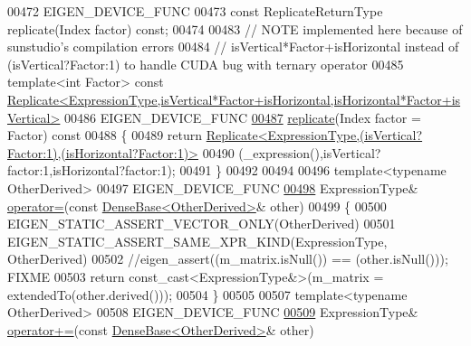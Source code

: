 \begin{DoxyCode}
00472     EIGEN\_DEVICE\_FUNC
00473     \textcolor{keyword}{const} ReplicateReturnType replicate(Index factor) \textcolor{keyword}{const};
00474 
00483     \textcolor{comment}{// NOTE implemented here because of sunstudio's compilation errors}
00484     \textcolor{comment}{// isVertical*Factor+isHorizontal instead of (isVertical?Factor:1) to handle CUDA bug with ternary
       operator}
00485     \textcolor{keyword}{template}<\textcolor{keywordtype}{int} Factor> \textcolor{keyword}{const} 
      \hyperlink{group___core___module_class_eigen_1_1_replicate}{Replicate<ExpressionType,isVertical*Factor+isHorizontal,isHorizontal*Factor+isVertical>}
00486     EIGEN\_DEVICE\_FUNC
\hyperlink{group___core___module_adafbfe5f623bc8fdc9877eb073f1ba5c}{00487}     \hyperlink{group___core___module_adafbfe5f623bc8fdc9877eb073f1ba5c}{replicate}(Index factor = Factor)\textcolor{keyword}{ const}
00488 \textcolor{keyword}{    }\{
00489       \textcolor{keywordflow}{return} 
      \hyperlink{group___core___module_class_eigen_1_1_replicate}{Replicate<ExpressionType,(isVertical?Factor:1),(isHorizontal?Factor:1)>}
00490           (\_expression(),isVertical?factor:1,isHorizontal?factor:1);
00491     \}
00492 
00494 
00496     \textcolor{keyword}{template}<\textcolor{keyword}{typename} OtherDerived>
00497     EIGEN\_DEVICE\_FUNC
\hyperlink{group___core___module_a61f54a2994758cc098671d5f0f36cfa6}{00498}     ExpressionType& \hyperlink{group___core___module_a61f54a2994758cc098671d5f0f36cfa6}{operator=}(\textcolor{keyword}{const} \hyperlink{group___core___module_class_eigen_1_1_dense_base}{DenseBase<OtherDerived>}& other)
00499     \{
00500       EIGEN\_STATIC\_ASSERT\_VECTOR\_ONLY(OtherDerived)
00501       EIGEN\_STATIC\_ASSERT\_SAME\_XPR\_KIND(ExpressionType, OtherDerived)
00502       \textcolor{comment}{//eigen\_assert((m\_matrix.isNull()) == (other.isNull())); FIXME}
00503       \textcolor{keywordflow}{return} \textcolor{keyword}{const\_cast<}ExpressionType&\textcolor{keyword}{>}(m\_matrix = extendedTo(other.derived()));
00504     \}
00505 
00507     \textcolor{keyword}{template}<\textcolor{keyword}{typename} OtherDerived>
00508     EIGEN\_DEVICE\_FUNC
\hyperlink{group___core___module_ad60d01ea6717f9ef6fd7941cf8b99db7}{00509}     ExpressionType& \hyperlink{group___core___module_ad60d01ea6717f9ef6fd7941cf8b99db7}{operator+=}(\textcolor{keyword}{const} \hyperlink{group___core___module_class_eigen_1_1_dense_base}{DenseBase<OtherDerived>}& other)

\end{DoxyCode}
